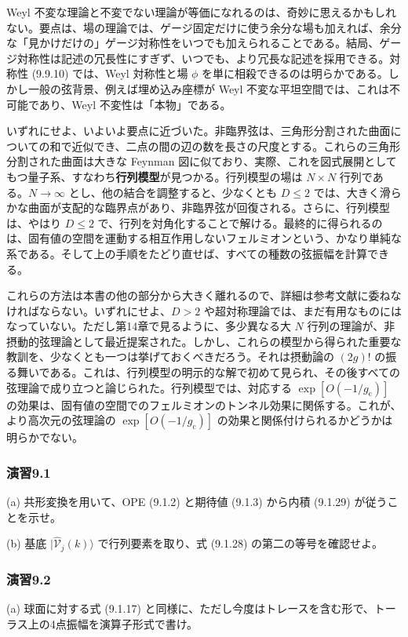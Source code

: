 Weyl 不変な理論と不変でない理論が等価になれるのは、奇妙に思えるかもしれない。要点は、場の理論では、ゲージ固定だけに使う余分な場も加えれば、余分な「見かけだけの」ゲージ対称性をいつでも加えられることである。結局、ゲージ対称性は記述の冗長性にすぎず、いつでも、より冗長な記述を採用できる。対称性 (9.9.10) では、Weyl 対称性と場 $\phi$ を単に相殺できるのは明らかである。しかし一般の弦背景、例えば埋め込み座標が Weyl 不変な平坦空間では、これは不可能であり、Weyl 不変性は「本物」である。

いずれにせよ、いよいよ要点に近づいた。非臨界弦は、三角形分割された曲面についての和で近似でき、二点の間の辺の数を長さの尺度とする。これらの三角形分割された曲面は大きな Feynman 図に似ており、実際、これを図式展開としてもつ量子系、すなわち\textbf{行列模型}が見つかる。行列模型の場は $N\times N$ 行列である。$N\to\infty$ とし、他の結合を調整すると、少なくとも $D\leq2$ では、大きく滑らかな曲面が支配的な臨界点があり、非臨界弦が回復される。さらに、行列模型は、やはり $D\leq2$ で、行列を対角化することで解ける。最終的に得られるのは、固有値の空間を運動する相互作用しないフェルミオンという、かなり単純な系である。そして上の手順をたどり直せば、すべての種数の弦振幅を計算できる。

これらの方法は本書の他の部分から大きく離れるので、詳細は参考文献に委ねなければならない。いずれにせよ、$D>2$ や超対称理論では、まだ有用なものにはなっていない。ただし第14章で見るように、多少異なる大 $N$ 行列の理論が、非摂動的弦理論として最近提案された。しかし、これらの模型から得られた重要な教訓を、少なくとも一つは挙げておくべきだろう。それは摂動論の $(2g)!$ の振る舞いである。これは、行列模型の明示的な解で初めて見られ、その後すべての弦理論で成り立つと論じられた。行列模型では、対応する $\exp[O(-1/g_{\mathrm c})]$ の効果は、固有値の空間でのフェルミオンのトンネル効果に関係する。これが、より高次元の弦理論の $\exp[O(-1/g_{\mathrm c})]$ の効果と関係付けられるかどうかは明らかでない。


\subsubsection*{演習9.1}\label{ex:9.1}
(a) 共形変換を用いて、OPE (9.1.2) と期待値 (9.1.3) から内積 (9.1.29) が従うことを示せ。

(b) 基底 $|\widehat{\mathcal V}_j(k)\rangle$ で行列要素を取り、式 (9.1.28) の第二の等号を確認せよ。

\subsubsection*{演習9.2}\label{ex:9.2}
(a) 球面に対する式 (9.1.17) と同様に、ただし今度はトレースを含む形で、トーラス上の4点振幅を演算子形式で書け。


